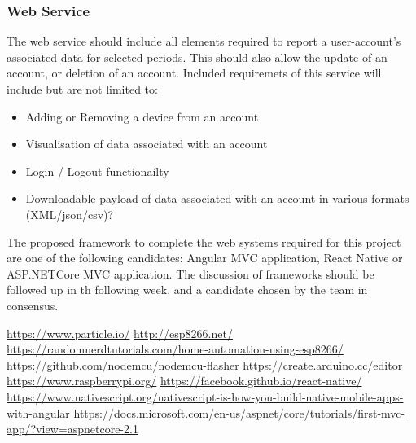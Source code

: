 \documentclass{article}
\begin{document}
            \subsubsection{Web Service}
            The web service should include all elements required to report a user-account's associated data
            for selected periods. This should also allow the update of an account, or deletion of an account.
            Included requiremets of this service will include but are not limited to:
            \begin{itemize}
                \item Adding or Removing a device from an account
                \item Visualisation of data associated with an account
                \item Login / Logout functionailty
                \item Downloadable payload of data associated with an account in various formats (XML/json/csv)?
            \end{itemize}
            \par
            The proposed framework to complete the web systems required for this project are one of the following 
            candidates: Angular MVC application\cite{Angular}, React Native\cite{ReactNative} or ASP.NETCore MVC 
            application\cite{ASP.NETcore-MVC}.
            The discussion of frameworks should be followed up in th following week, and a candidate chosen
            by the team in consensus.
            
    \newpage

    \begin{thebibliography}
        \raggedright
            \url{https://www.particle.io/}
            \url{http://esp8266.net/}
            \url{https://randomnerdtutorials.com/home-automation-using-esp8266/}
            \url{https://github.com/nodemcu/nodemcu-flasher}
            \url{https://create.arduino.cc/editor}
            \url{https://www.raspberrypi.org/}
            \url{https://facebook.github.io/react-native/}
            \url{https://www.nativescript.org/nativescript-is-how-you-build-native-mobile-apps-with-angular}
            \url{https://docs.microsoft.com/en-us/aspnet/core/tutorials/first-mvc-app/?view=aspnetcore-2.1}
    \end{thebibliography}

    
\end{document}
